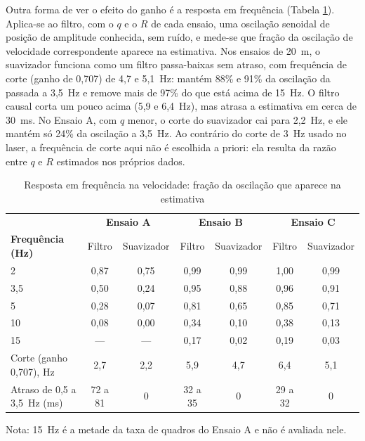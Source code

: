 \documentclass[
    12pt,               %
    openright,          %
    twoside,            %
    a4paper,            %
    chapter=TITLE,      %
    english,            %
    brazil              %
    ]{abntex2}
\begin{document}
Outra forma de ver o efeito do ganho é a resposta em frequência (Tabela \ref{tab:frequencia}). Aplica-se ao filtro, com o $q$ e o $R$ de cada ensaio, uma oscilação senoidal de posição de amplitude conhecida, sem ruído, e mede-se que fração da oscilação de velocidade correspondente aparece na estimativa. Nos ensaios de 20~m, o suavizador funciona como um filtro passa-baixas sem atraso, com frequência de corte (ganho de 0,707) de 4,7 e 5,1~Hz: mantém 88\% e 91\% da oscilação da passada a 3,5~Hz e remove mais de 97\% do que está acima de 15~Hz. O filtro causal corta um pouco acima (5,9 e 6,4~Hz), mas atrasa a estimativa em cerca de 30~ms. No Ensaio A, com $q$ menor, o corte do suavizador cai para 2,2~Hz, e ele mantém só 24\% da oscilação a 3,5~Hz. Ao contrário do corte de 3~Hz usado no laser, a frequência de corte aqui não é escolhida a priori: ela resulta da razão entre $q$ e $R$ estimados nos próprios dados.

\begin{table}[H]
\centering
\small
\caption{Resposta em frequência na velocidade: fração da oscilação que aparece na estimativa}
\label{tab:frequencia}
\footnotesize
\setlength{\tabcolsep}{4pt}
\begin{tabular}{lcccccc}
\hline
 & \multicolumn{2}{c}{\textbf{Ensaio A}} & \multicolumn{2}{c}{\textbf{Ensaio B}} & \multicolumn{2}{c}{\textbf{Ensaio C}} \\
\textbf{Frequência (Hz)} & Filtro & Suavizador & Filtro & Suavizador & Filtro & Suavizador \\
\hline
2 & 0,87 & 0,75 & 0,99 & 0,99 & 1,00 & 0,99 \\
3,5 & 0,50 & 0,24 & 0,95 & 0,88 & 0,96 & 0,91 \\
5 & 0,28 & 0,07 & 0,81 & 0,65 & 0,85 & 0,71 \\
10 & 0,08 & 0,00 & 0,34 & 0,10 & 0,38 & 0,13 \\
15 & --- & --- & 0,17 & 0,02 & 0,19 & 0,03 \\
Corte (ganho 0,707), Hz & 2,7 & 2,2 & 5,9 & 4,7 & 6,4 & 5,1 \\
Atraso de 0,5 a 3,5~Hz (ms) & 72 a 81 & 0 & 32 a 35 & 0 & 29 a 32 & 0 \\
\hline
\end{tabular}

{\footnotesize Nota: 15~Hz é a metade da taxa de quadros do Ensaio A e não é avaliada nele.}
\end{table}
\end{document}
